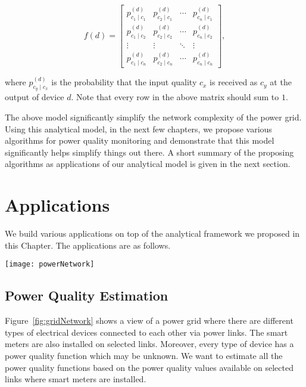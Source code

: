 \begin{equation}
f(d) = \left[\begin{array}{cccc} p_{c_1 \mid c_1}^{(d)} & p_{c_2 \mid c_1}^{(d)} & \cdots & p_{c_n \mid c_1}^{(d)}\\
p_{c_1 \mid c_2}^{(d)} & p_{c_2 \mid c_2}^{(d)} & \cdots & p_{c_n \mid c_2}^{(d)}\\
\vdots & \vdots& \ddots & \vdots\\
p_{c_1 \mid c_n}^{(d)} & p_{c_2 \mid c_n}^{(d)} & \cdots & p_{c_n \mid c_n}^{(d)}
\end{array}\right],
\end{equation}

\noindent
where $p_{c_y \mid c_x}^{(d)}$ is the probability that the input quality $c_x$ is received as $c_y$ at the output of device $d$. Note that every row in the above matrix should sum to $1$.

The above model significantly simplify the network complexity of the power grid. Using this analytical model, in the next few chapters, we propose various algorithms for power quality monitoring and demonstrate that this model significantly helps simplify things out there. A short summary of the proposing algorithms as applications of our analytical model is given in the next section.

\section{Applications}
We build various applications on top of the analytical framework we proposed in this Chapter. The applications are as follows.

\begin{figure*}[!t]
    \centering
    \texttt{[image: powerNetwork]}
    \caption{A simple view of power microgrid}
    \label{fig:gridNetwork}
\end{figure*}


\subsection{Power Quality Estimation}
Figure~\ref{fig:gridNetwork} shows a view of a power grid where there are different types of electrical devices connected to each other via power links. The smart meters are also installed on selected links. Moreover, every type of device has a power quality function which may be unknown. We want to estimate all the power quality functions based on the power quality values available on selected links where smart meters are installed.

